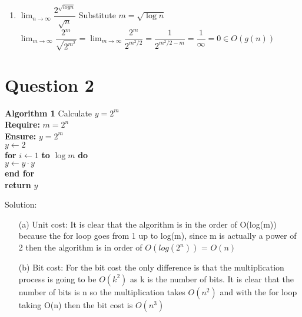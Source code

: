 \documentclass{report}
\begin{document}
\begin{enumerate}
		\item $\lim_{n \to \infty} \dfrac{2^{\sqrt{log n}}}{\sqrt{n}}$ Substitute $m = \sqrt{\log n}$
		\newline
		\newline $\lim_{m \to \infty} \dfrac{2^m}{\sqrt{2^{m^2}}} = \lim_{m \to \infty} \dfrac{2^m}{2^{m^2 / 2}} = \dfrac{1}{2^{m^2 / 2 - m}} = \dfrac{1}{\infty}= 0 \in O(g(n))$
	\end{enumerate}
	
	\vspace{2cm}
	\section*{Question 2}
	\textbf{Algorithm 1} Calculate \(y = 2^m\) \\
	\textbf{Require:} \(m = 2^n\) \\
	\textbf{Ensure:} \(y = 2^m\) \\
	\(y \leftarrow 2\) \\
	\textbf{for} \(i \leftarrow 1\) \textbf{to} \(\log m\) \textbf{do} \\
	\quad \(y \leftarrow y \cdot y\) \\
	\textbf{end for} \\
	\textbf{return} \(y\)
	
	Solution:
	\begin{itemize}
		\item[(a)] Unit cost: It is clear that the algorithm is in the order of O(log(m)) because the for loop goes from 1 up to log(m), since m is actually a power of 2
		then the algorithm is in order of $O(log(2^n))$ = $O(n)$
		
		\item[(b)] Bit cost: For the bit cost the only difference is that the multiplication process is going to be $O(k^2)$ as k is the number of bits.
		It is clear that the number of bits is n so the multiplication takes $O(n^2)$ and with the for loop taking O(n)  then the bit cost is $O(n^3)$
	\end{itemize}
	
\end{document}
